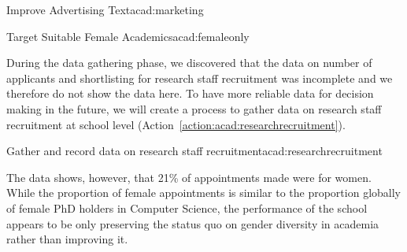 \begin{actionblock}{\ksspace{}Improve Advertising Text}{acad:marketing}
\actimproveadvertisingtext
\hfill{
    \hypersetup{hidelinks}
    \hyperlink{c2}{\gotoactionsymbol{}}
}
\end{actionblock}



\begin{actionblock}{\ksspace{}Target Suitable Female Academics}{acad:femaleonly}
\acttargetfemales
\hfill{
    \hypersetup{hidelinks}
    \hyperlink{c1}{\gotoactionsymbol{}}
}
\end{actionblock}

%
%
During the data gathering phase, we discovered that the data on number of applicants and shortlisting for research staff recruitment was incomplete and we therefore do not show the data here. To have more reliable data for decision making in the future, we will create a process to gather data on research staff recruitment at school level (Action~\ref{action:acad:researchrecruitment}).

\begin{actionblock}{\ksspace{}Gather and record data on research staff recruitment}{acad:researchrecruitment}
\acttrackgenderinfostaff
\hfill{
    \hypersetup{hidelinks}
    \hyperlink{c3}{\gotoactionsymbol{}}
}
\end{actionblock}


The data shows, however, that 21\% of appointments made were for women. While the proportion of female appointments is similar to the proportion globally of female PhD holders in Computer Science, the performance of the school appears to be only preserving the status quo on gender diversity in academia rather than improving it. 

